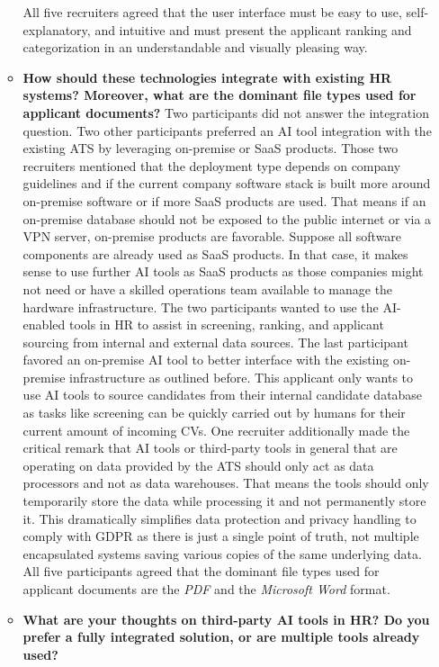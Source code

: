 \documentclass[draft,final]{thesisclass} %
\begin{document}
\begin{enumerate}
\begin{itemize}
        All five recruiters agreed that the user interface must be easy to use, self-explanatory, and intuitive and must present the applicant ranking and categorization in an understandable and visually pleasing way.
        \item \textbf{How should these technologies integrate with existing \acs{HR} systems? Moreover, what are the dominant file types used for applicant documents?}
        Two participants did not answer the integration question. Two other participants preferred an \acs{AI} tool integration with the existing \acs{ATS} by leveraging on-premise or \acs{SaaS} products. Those two recruiters mentioned that the deployment type depends on company guidelines and if the current company software stack is built more around on-premise software or if more \acs{SaaS} products are used. That means if an on-premise database should not be exposed to the public internet or via a VPN server, on-premise products are favorable. Suppose all software components are already used as \acs{SaaS} products. In that case, it makes sense to use further \acs{AI} tools as \acs{SaaS} products as those companies might not need or have a skilled operations team available to manage the hardware infrastructure. The two participants wanted to use the \acs{AI}-enabled tools in \acs{HR} to assist in screening, ranking, and applicant sourcing from internal and external data sources.
        The last participant favored an on-premise \acs{AI} tool to better interface with the existing on-premise infrastructure as outlined before. This applicant only wants to use \acs{AI} tools to source candidates from their internal candidate database as tasks like screening can be quickly carried out by humans for their current amount of incoming \acs{CV}s.
        One recruiter additionally made the critical remark that \acs{AI} tools or third-party tools in general that are operating on data provided by the \acs{ATS} should only act as data processors and not as data warehouses. That means the tools should only temporarily store the data while processing it and not permanently store it.
        This dramatically simplifies data protection and privacy handling to comply with \acs{GDPR} as there is just a single point of truth, not multiple encapsulated systems saving various copies of the same underlying data.
        All five participants agreed that the dominant file types used for applicant documents are the \textit{PDF} and the \textit{Microsoft Word} format.
        \item \textbf{What are your thoughts on third-party \acs{AI} tools in \acs{HR}? Do you prefer a fully integrated solution, or are multiple tools already used?}

\end{itemize}
\end{enumerate}
\end{document}
